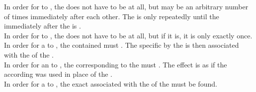 {In order for  to , the  does not have to be  at all, but may be  an arbitrary number of times immediately after each other. The  is only repeatedly  until the  immediately after the  is . \\

In order for  to , the  does not have to be  at all, but if it is, it is only  exactly once. \\

In order for a  to , the  contained must . The specific   by the  is then associated with the  of the . \\

In order for an  to , the  corresponding to the  must . The effect is as if the according  was used in place of the .\\

In order for a  to , the exact  associated with the  of the  must be found.
}


